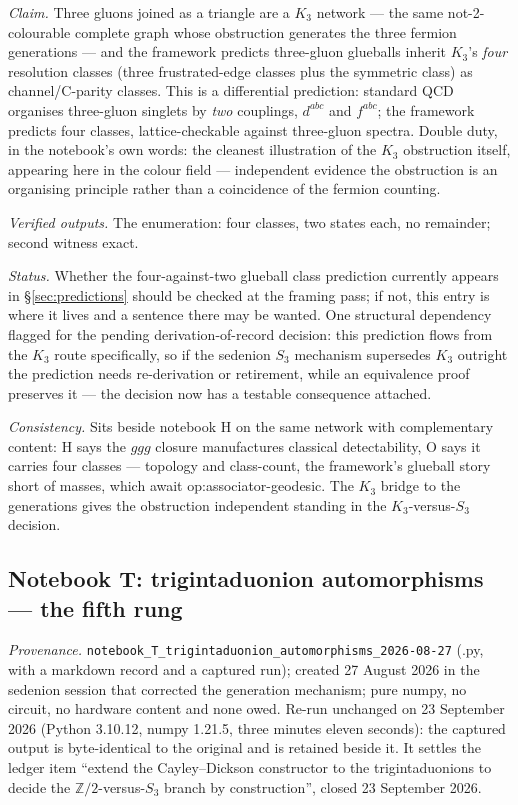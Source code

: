 \emph{Claim.} Three gluons joined as a triangle are a $K_{3}$ network --- the same
not-2-colourable complete graph whose obstruction generates the three fermion generations ---
and the framework predicts three-gluon glueballs inherit $K_{3}$'s \emph{four} resolution
classes (three frustrated-edge classes plus the symmetric class) as channel/C-parity classes.
This is a differential prediction: standard QCD organises three-gluon singlets by \emph{two}
couplings, $d^{abc}$ and $f^{abc}$; the framework predicts four classes, lattice-checkable
against three-gluon spectra. Double duty, in the notebook's own words: the cleanest
illustration of the $K_{3}$ obstruction itself, appearing here in the colour field ---
independent evidence the obstruction is an organising principle rather than a coincidence of
the fermion counting.

\emph{Verified outputs.} The enumeration: four classes, two states each, no remainder;
second witness exact.

\emph{Status.} Whether the four-against-two glueball class prediction currently appears in
\S\ref{sec:predictions} should be checked at the framing pass; if not, this entry is where it
lives and a sentence there may be wanted. One structural dependency flagged for the pending
derivation-of-record decision: this prediction flows from the $K_{3}$ route specifically, so if
the sedenion $S_{3}$ mechanism supersedes $K_{3}$ outright the prediction needs re-derivation
or retirement, while an equivalence proof preserves it --- the decision now has a testable
consequence attached.

\emph{Consistency.} Sits beside notebook H on the same network with complementary content: H
says the $ggg$ closure manufactures classical detectability, O says it carries four classes ---
topology and class-count, the framework's glueball story short of masses, which await
op:associator-geodesic. The $K_{3}$ bridge to the generations gives the obstruction independent
standing in the $K_{3}$-versus-$S_{3}$ decision.

\subsection{Notebook T: trigintaduonion automorphisms --- the fifth rung}
\label{app:nb-T}

\emph{Provenance.} \texttt{notebook\_T\_trigintaduonion\_automorphisms\_2026-08-27} (.py, with a
markdown record and a captured run); created 27 August 2026 in the sedenion session that
corrected the generation mechanism; pure numpy, no circuit, no hardware content and none owed.
Re-run unchanged on 23 September 2026 (Python 3.10.12, numpy 1.21.5, three minutes eleven
seconds): the captured output is byte-identical to the original and is retained beside it. It
settles the ledger item ``extend the Cayley--Dickson constructor to the trigintaduonions to decide
the $\mathbb{Z}/2$-versus-$S_{3}$ branch by construction'', closed 23 September 2026.


